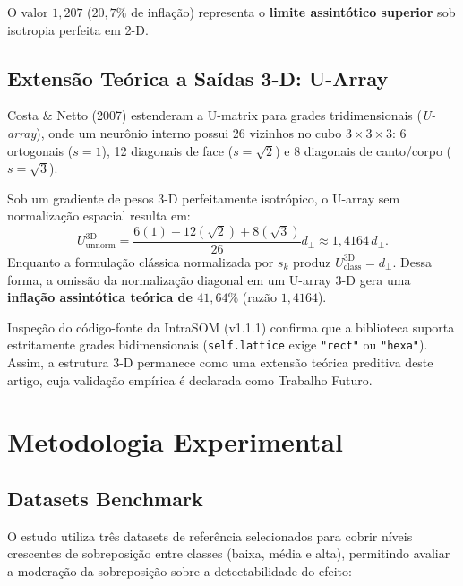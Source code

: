 \documentclass[10pt,journal,compsoc,twocolumn]{IEEEtran}
\begin{document}
O valor $1{,}207$ ($20{,}7\%$ de infla\c{c}\~ao) representa o \textbf{limite
assint\'otico superior} sob isotropia perfeita em 2-D.

\subsection{Extens\~ao Te\'orica a Sa\'idas 3-D: U-Array}
\label{subsec:fator_3d}
Costa \& Netto (2007) \cite{costa2007segmentacao} estenderam a U-matrix para
grades tridimensionais (\textit{U-array}), onde um neur\^onio interno possui
26 vizinhos no cubo $3 \times 3 \times 3$: 6 ortogonais ($s=1$), 12 diagonais
de face ($s=\sqrt{2}$) e 8 diagonais de canto/corpo ($s=\sqrt{3}$).

Sob um gradiente de pesos 3-D perfeitamente isotr\'opico, o U-array sem normaliza\c{c}\~ao
espacial resulta em:
\begin{equation}
    U_{\text{unnorm}}^{\text{3D}} = \frac{6(1) + 12(\sqrt{2}) + 8(\sqrt{3})}{26} d_{\perp} \approx 1{,}4164 \, d_{\perp}.
\end{equation}
Enquanto a formula\c{c}\~ao cl\'assica normalizada por $s_k$ produz $U_{\text{class}}^{\text{3D}} = d_{\perp}$.
Dessa forma, a omiss\~ao da normaliza\c{c}\~ao diagonal em um U-array 3-D gera uma
\textbf{infla\c{c}\~ao assint\'otica te\'orica de $41{,}64\%$} (raz\~ao $1{,}4164$).

Inspe\c{c}\~ao do c\'odigo-fonte da IntraSOM (v1.1.1) confirma que a biblioteca suporta
estritamente grades bidimensionais (\texttt{self.lattice} exige \texttt{"rect"} ou
\texttt{"hexa"}). Assim, a estrutura 3-D permanece como uma extens\~ao te\'orica
preditiva deste artigo, cuja valida\c{c}\~ao emp\'irica \'e declarada como Trabalho Futuro.

\section{Metodologia Experimental}
\label{sec:metodologia}

\subsection{Datasets Benchmark}
\label{subsec:datasets}
O estudo utiliza tr\^es datasets de refer\^encia selecionados para cobrir n\'iveis
crescentes de sobreposi\c{c}\~ao entre classes (baixa, m\'edia e alta), permitindo
avaliar a modera\c{c}\~ao da sobreposi\c{c}\~ao sobre a detectabilidade do efeito:
\end{document}
